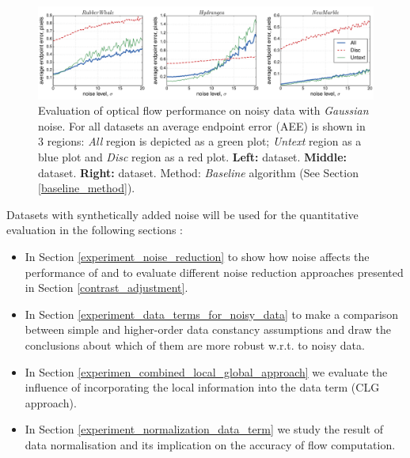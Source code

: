\begin{figure}[h]
    \centering
    \includegraphics[width=\textwidth]{figures/exp_noise_comp_3_datasets.pdf}
  
  \caption[Noise evaluation]{Evaluation of optical flow performance on noisy data with \textit{Gaussian} noise. For all datasets an average endpoint error (AEE) is shown in 3 regions: \textit{All} region is depicted as a green plot; \textit{Untext} region as a blue plot and \textit{Disc} region as a red plot.  \textbf{Left:} \rub dataset. \textbf{Middle:} \hyd dataset. \textbf{Right:} \mar dataset. Method: \textit{Baseline} algorithm (See Section \ref{baseline_method}).}
  \label{fig:noise_evaluation}
\end{figure}


Datasets with synthetically added noise will be used for the quantitative evaluation in the following sections :
\begin{itemize}
 \item In Section \ref{experiment_noise_reduction} to show how noise affects the performance of \opticalflow and to evaluate different noise reduction approaches presented in Section \ref{contrast_adjustment}.
 
 \item In Section \ref{experiment_data_terms_for_noisy_data} to make a comparison between simple and higher-order data constancy assumptions and draw the conclusions about which of them are more robust w.r.t. to noisy data.
 
 \item In Section \ref{experimen_combined_local_global_approach} we evaluate the influence of incorporating the local information into the data term (CLG approach).
 
 \item In Section \ref{experiment_normalization_data_term} we study the result of data normalisation and its implication on the accuracy of flow computation.
 
\end{itemize}

